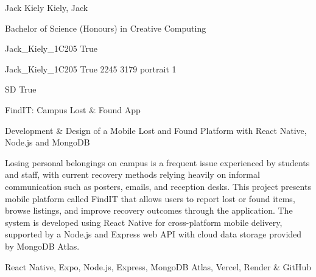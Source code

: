 \documentclass[twoside]{report}
\begin{document}
\begingroup{}\relax



\def\Key{Jack_Kiely_1C205}

{Jack Kiely}
{Kiely, Jack}

{Bachelor of Science (Honours) in Creative Computing}

{Jack_Kiely_1C205}
{True}

{Jack_Kiely_1C205}
{True}
{2245}
{3179}
{portrait}
{1}

{SD}
{True}

{FindIT: Campus Lost \& Found App}

{Development \& Design of a Mobile Lost and Found Platform with React Native, Node.js and MongoDB}

{Losing personal belongings on campus is a frequent issue experienced by students and staff, with current recovery methods relying heavily on informal communication such as posters, emails, and reception desks. This project presents mobile platform called FindIT that allows users to report lost or found items, browse listings, and improve recovery outcomes through the application. The system is developed using {React Native} for cross-platform mobile delivery, supported by a {Node.js} and {Express} web {API} with cloud data storage provided by {MongoDB Atlas}.}

{React Native, Expo, Node.js, Express, MongoDB Atlas, Vercel, Render \& GitHub}
\end{document}
